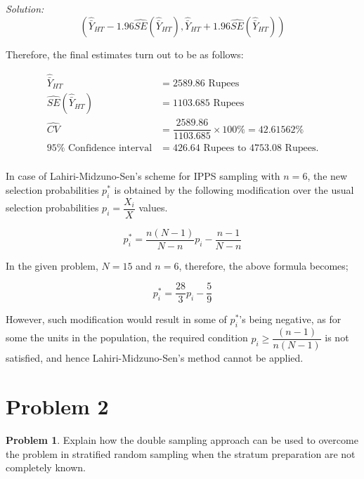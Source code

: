 \documentclass[12pt]{article}
\theoremstyle{definition}
\newtheorem*{prb}{Problem}
\newenvironment{problem}{
\begin{tcolorbox}[colback=blue!5!white,colframe=blue!75!black, parbox = true] \begin{prb}  }{\end{prb}\end{tcolorbox} }
\newenvironment{answer}{\textit{Solution: }\quad }{ \hfill \qedsymbol}
\begin{document}
\begin{answer}
	$$\left( \widehat{\bar{Y}}_{HT} - 1.96\widehat{SE}(\widehat{\bar{Y}}_{HT}), \widehat{\bar{Y}}_{HT} + 1.96\widehat{SE}(\widehat{\bar{Y}}_{HT}) \right)$$

	Therefore, the final estimates turn out to be as follows:

	\begin{align*}
		\widehat{\bar{Y}}_{HT} & = 2589.86 \text{ Rupees }\\
		\widehat{SE}(\widehat{\bar{Y}}_{HT}) & = 1103.685 \text{ Rupees}\\
		\widehat{CV} & = \dfrac{2589.86}{1103.685}\times 100\% = 42.61562\%\\
		95\% \text{ Confidence interval} & = 426.64 \text{ Rupees to }  4753.08 \text{ Rupees.}\\
	\end{align*}


	In case of Lahiri-Midzuno-Sen's scheme for IPPS sampling with $n = 6$, the new selection probabilities $p_i^\ast$ is obtained by the following modification over the usual selection probabilities $p_i = \dfrac{X_i}{X}$ values.

	$$p_i^\ast = \dfrac{n(N-1)}{N - n} p_i - \dfrac{n-1}{N-n}$$

	In the given problem, $N = 15$ and $n = 6$, therefore, the above formula becomes;

	$$p_i^\ast = \dfrac{28}{3} p_i - \dfrac{5}{9}$$

	However, such modification would result in some of $p_i^\ast$'s being negative, as for some the units in the population, the required condition $p_i \geq \dfrac{(n-1)}{n(N-1)}$ is not satisfied, and hence Lahiri-Midzuno-Sen's method cannot be applied.
\end{answer}




\section{Problem 2}

\begin{problem}
	Explain how the double sampling approach can be used to overcome the problem in stratified random sampling when the stratum preparation are not completely known.
\end{problem}
\end{document}
